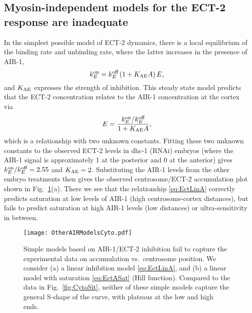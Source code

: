 \documentclass[11pt]{article}
\begin{document}
\begin{appendix}
\subsection{Myosin-independent models for the ECT-2 response are inadequate \label{sec:MyIndModels}}
In the simplest possible model of ECT-2 dynamics, there is a local equilibrium of the binding rate and unbinding rate, where the latter increases in the presence of AIR-1,
\begin{equation}
\label{eq:EctA}
 k^\text{on}_E = k^\text{off}_E \left(1+K_\text{AE} A \right)E,
\end{equation}
and $K_\text{AE}$ expresses the strength of inhibition. This steady state model predicts that the ECT-2 concentration relates to the AIR-1 concentration at the cortex via
\begin{equation}
\label{eq:EctLinA}
E = \frac{k^\text{on}_E/ k^\text{off}_E}{ 1+K_\text{AE} A},
\end{equation}
which is a relationship with two unknown constants. Fitting these two unknown constants to the observed ECT-2 levels in dhc-1 (RNAi) embryos (where the AIR-1 signal is approximately 1 at the posterior and 0 at the anterior) gives $k^\text{on}_E/ k^\text{off}_E=2.55$ and $K_\text{AE}=2$. Substituting the AIR-1 levels from the other embryo treatments then gives the observed centrosome/ECT-2 accumulation plot shown in Fig.\ \ref{fig:LinFail}(a). There we see that the relationship \eqref{eq:EctLinA} correctly predicts saturation at low levels of AIR-1 (high centrosome-cortex distances), but fails to predict saturation at high AIR-1 levels (low distances) or ultra-sensitivity in between. 

\begin{figure}
\centering
\texttt{[image: OtherAIRModelsCyto.pdf]}
\caption{\label{fig:LinFail}Simple models based on AIR-1/ECT-2 inhibition fail to capture the experimental data on accumulation vs.\ centrosome position. We consider (a) a linear inhibition model \eqref{eq:EctLinA}, and (b) a linear model with saturation \eqref{eq:EctASat} (Hill function). Compared to the data in Fig.\ \ref{fig:CytoSit}, neither of these simple models capture the general S-shape of the curve, with plateaus at the low and high ends. }
\end{figure}


\end{appendix}
\end{document}
